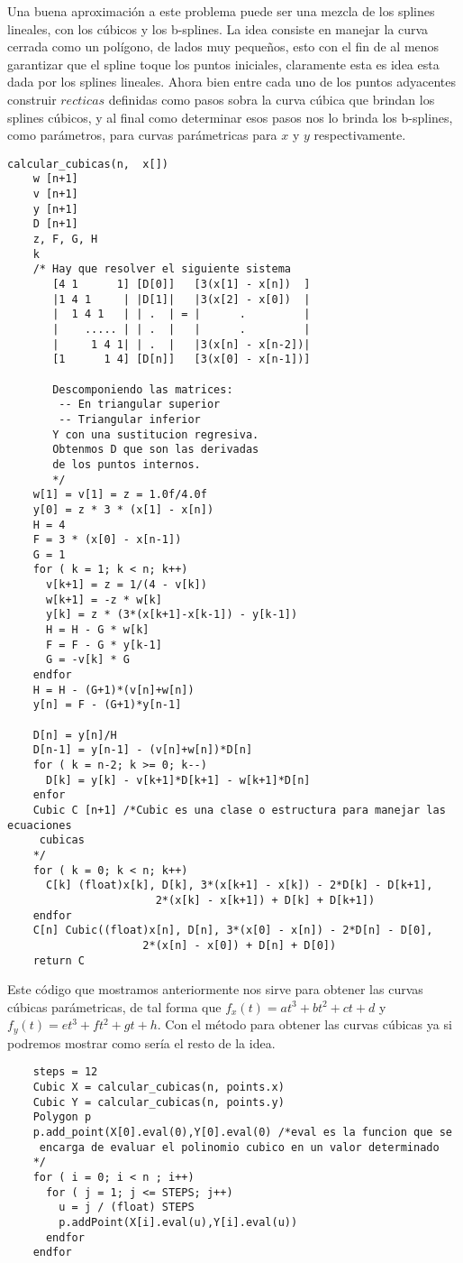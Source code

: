 Una buena aproximaci\'on a este problema puede ser una
mezcla de los splines lineales, con los c\'ubicos y los b-splines.
La idea consiste en manejar la curva cerrada como un pol\'igono, de lados
muy peque\~nos, esto con el fin de al menos garantizar que el spline
toque los puntos iniciales, claramente esta es idea esta dada por los
splines lineales. Ahora bien entre cada uno de los puntos
adyacentes construir $recticas$ definidas como pasos sobra la
curva c\'ubica que brindan los splines c\'ubicos, y al final como determinar
esos pasos nos lo brinda los b-splines, como par\'ametros,
para curvas par\'ametricas para $x$ y $y$ respectivamente.
\begin{verbatim}
calcular_cubicas(n,  x[])
    w [n+1]
    v [n+1]
    y [n+1]
    D [n+1]
    z, F, G, H
    k
    /* Hay que resolver el siguiente sistema
       [4 1      1] [D[0]]   [3(x[1] - x[n])  ]
       |1 4 1     | |D[1]|   |3(x[2] - x[0])  |
       |  1 4 1   | | .  | = |      .         |
       |    ..... | | .  |   |      .         |
       |     1 4 1| | .  |   |3(x[n] - x[n-2])|
       [1      1 4] [D[n]]   [3(x[0] - x[n-1])]

       Descomponiendo las matrices:
        -- En triangular superior
        -- Triangular inferior
       Y con una sustitucion regresiva.
       Obtenmos D que son las derivadas
       de los puntos internos.
       */
    w[1] = v[1] = z = 1.0f/4.0f
    y[0] = z * 3 * (x[1] - x[n])
    H = 4
    F = 3 * (x[0] - x[n-1])
    G = 1
    for ( k = 1; k < n; k++)
      v[k+1] = z = 1/(4 - v[k])
      w[k+1] = -z * w[k]
      y[k] = z * (3*(x[k+1]-x[k-1]) - y[k-1])
      H = H - G * w[k]
      F = F - G * y[k-1]
      G = -v[k] * G
    endfor
    H = H - (G+1)*(v[n]+w[n])
    y[n] = F - (G+1)*y[n-1]

    D[n] = y[n]/H
    D[n-1] = y[n-1] - (v[n]+w[n])*D[n]
    for ( k = n-2; k >= 0; k--)
      D[k] = y[k] - v[k+1]*D[k+1] - w[k+1]*D[n]
    enfor
    Cubic C [n+1] /*Cubic es una clase o estructura para manejar las ecuaciones
     cubicas
    */
    for ( k = 0; k < n; k++)
      C[k] (float)x[k], D[k], 3*(x[k+1] - x[k]) - 2*D[k] - D[k+1],
                       2*(x[k] - x[k+1]) + D[k] + D[k+1])
    endfor
    C[n] Cubic((float)x[n], D[n], 3*(x[0] - x[n]) - 2*D[n] - D[0],
                     2*(x[n] - x[0]) + D[n] + D[0])
    return C

\end{verbatim}
Este c\'odigo que mostramos anteriormente nos sirve para obtener las curvas c\'ubicas
par\'ametricas, de tal forma que $f_x(t) = at^3+bt^2+ct+d$ y $f_y(t) = et^3+ft^2+gt+h$.
Con el m\'etodo para obtener las curvas c\'ubicas ya si podremos mostrar
como ser\'ia el resto de la idea.
\begin{verbatim}
    steps = 12
    Cubic X = calcular_cubicas(n, points.x)
    Cubic Y = calcular_cubicas(n, points.y)
    Polygon p
    p.add_point(X[0].eval(0),Y[0].eval(0) /*eval es la funcion que se
     encarga de evaluar el polinomio cubico en un valor determinado
    */
    for ( i = 0; i < n ; i++)
      for ( j = 1; j <= STEPS; j++)
        u = j / (float) STEPS
        p.addPoint(X[i].eval(u),Y[i].eval(u))
      endfor
    endfor
\end{verbatim}


